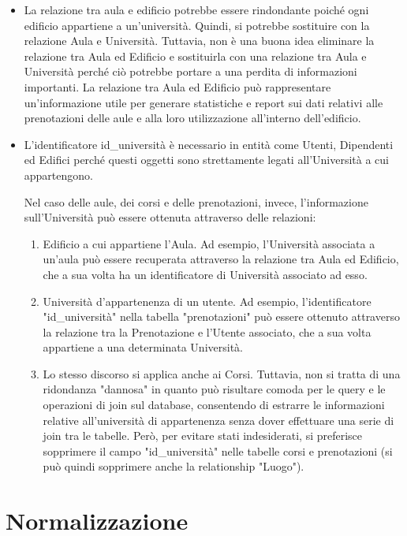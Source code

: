 \documentclass[a4paper, 10pt, oneside]{article} %
\begin{document}
\begin{itemize}
    \item La relazione tra aula e edificio potrebbe essere rindondante poiché ogni edificio appartiene a un'università. Quindi, si potrebbe sostituire con la relazione Aula e Università. Tuttavia, non è una buona idea eliminare la relazione tra Aula ed Edificio e sostituirla con una relazione tra Aula e Università perché ciò potrebbe portare a una perdita di informazioni importanti. La relazione tra Aula ed Edificio può rappresentare un'informazione utile per generare statistiche e report sui dati relativi alle prenotazioni delle aule e alla loro utilizzazione all'interno dell'edificio. 

    \item L'identificatore id\_università è necessario in entità come Utenti, Dipendenti ed Edifici perché questi oggetti sono strettamente legati all'Università a cui appartengono.

    Nel caso delle aule, dei corsi e delle prenotazioni, invece, l'informazione sull'Università può essere ottenuta attraverso delle relazioni:
    
    \begin{enumerate}
        \item Edificio a cui appartiene l'Aula. Ad esempio, l'Università associata a un'aula può essere recuperata attraverso la relazione tra Aula ed Edificio, che a sua volta ha un identificatore di Università associato ad esso. \item Università d'appartenenza di un utente. Ad esempio, l'identificatore "id\_università" nella tabella "prenotazioni" può essere ottenuto attraverso la relazione tra la Prenotazione e l'Utente associato, che a sua volta appartiene a una determinata Università.
        \item Lo stesso discorso si applica anche ai Corsi. Tuttavia, non si tratta di una ridondanza "dannosa" in quanto può risultare comoda per le query e le operazioni di join sul database, consentendo di estrarre le informazioni relative all'università di appartenenza senza dover effettuare una serie di join tra le tabelle. Però, per evitare stati indesiderati, si preferisce sopprimere il campo "id\_università" nelle tabelle corsi e prenotazioni (si può quindi sopprimere anche la relationship "Luogo").
        
        
    \end{enumerate}
\end{itemize}


\section{Normalizzazione}
\end{document}
